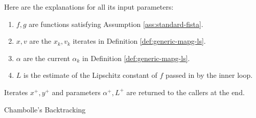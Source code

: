 \documentclass[12pt]{report}
\begin{document}
            Here are the explanations for all its input parameters: 
            \begin{enumerate}
                \item $f, g$ are functions satisfying Assumption \ref{ass:standard-fista}. 
                \item $x, v$ are the $x_k, v_k$ iterates in Definition \ref{def:generic-mapg-ls}. 
                \item $\alpha$ are the current $\alpha_k$ in Definition \ref{def:generic-mapg-ls}. 
                \item $L$ is the estimate of the Lipschitz constant of $f$ passed in by the inner loop. 
            \end{enumerate}
            Iterates $x^+, y^+$ and parameters $\alpha^+, L^+$ are returned to the callers at the end. 
            \begin{algorithm}[H]
                {\small
                \begin{algorithmic}[1]
                        \ENDIF
                    \ENDFOR
                    \caption{Chambolle's Backtracking}\label{alg:chambolle-btls}
                \end{algorithmic}
                }
            \end{algorithm}
\end{document}

